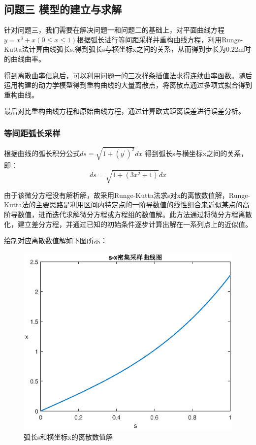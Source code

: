\documentclass[withoutpreface,bwprint]{cumcmthesis}
\begin{document}
\subsection{问题三 模型的建立与求解}
针对问题三，我们需要在解决问题一和问题二的基础上，对平面曲线方程$y=x^3+x(0 \leq x \leq 1)$根据弧长进行等间距采样并重构曲线方程，利用Runge-Kutta法计算曲线弧长s,得到弧长s与横坐标x之间的关系，从而得到步长为$0.22$m时的曲线曲率。

得到离散曲率信息后，可以利用问题一的三次样条插值法求得连续曲率函数。随后运用构建的动力学模型得到重构曲线的大量离散点，将离散点通过多项式拟合得到重构曲线。

最后对比重构曲线方程和原始曲线方程，通过计算欧式距离误差进行误差分析。

\subsubsection{等间距弧长采样}
根据曲线的弧长积分公式$d s=\sqrt{1+\left(y^{\prime}\right)^2} d x$ 得到弧长s与横坐标x之间的关系，即：
\begin{equation}
d s=\sqrt{1+\left(3 x^2+1\right)} d x
\end{equation}

由于该微分方程没有解析解，故采用Runge-Kutta法求s对x的离散数值解，Runge-Kutta法的主要思路是利用区间内特定点的一阶导数值的线性组合来近似某点的高阶导数值，进而迭代求解微分方程或方程组的数值解。此方法通过将微分方程离散化，建立差分方程，并通过已知的初始条件逐步计算出解在一系列点上的近似值。

绘制对应离散数值解如下图所示：
\begin{figure}[!h]
\centering
\includegraphics[width=.5\textwidth]{Q3.eps}
\caption{弧长s和横坐标x的离散数值解}
\end{figure}

\vspace{6cm}
\end{document}
